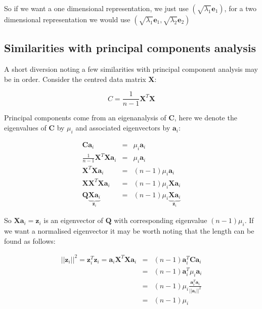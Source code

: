 So if we want a one dimensional representation, we just use  $\left( \sqrt{\lambda_{1}} \boldsymbol{e}_{1} \right) $, for a two dimensional representation we would use  $\left( \sqrt{\lambda_{1}} \boldsymbol{e}_{1},   \sqrt{\lambda_{2}} \boldsymbol{e}_{2} \right)$


\subsection{Similarities with principal components analysis}

A short diversion noting a few similarities with principal component analysis may be in order.   Consider the centred data matrix $\boldsymbol{X}$:

\begin{displaymath}
C = \frac{1}{n-1} \boldsymbol{X}^{T} \boldsymbol{X}
\end{displaymath}

Principal components come from an eigenanalysis of $\boldsymbol{C}$, here we denote the eigenvalues of $\boldsymbol{C}$ by $\mu_{i}$ and associated eigenvectors by $\boldsymbol{a}_{i}$:

\begin{eqnarray*}
\boldsymbol{C} \boldsymbol{a}_{i} &=& \mu_{i} \boldsymbol{a}_{i}\\
\frac{1}{n-1}\boldsymbol{X}^{T} \boldsymbol{X} \boldsymbol{a}_{i} &=& \mu_{i} \boldsymbol{a}_{i}\\
\boldsymbol{X}^{T} \boldsymbol{X} \boldsymbol{a}_{i} &=& (n-1)\mu_{i} \boldsymbol{a}_{i}\\
\boldsymbol{X}\boldsymbol{X}^{T} \boldsymbol{X} \boldsymbol{a}_{i} &=& (n-1)\mu_{i} \boldsymbol{X} \boldsymbol{a}_{i}\\
\boldsymbol{Q} \underbrace{\boldsymbol{X} \boldsymbol{a}_{i}}_{\boldsymbol{z}_{i}} &=& (n-1)\mu_{i} \underbrace{\boldsymbol{X} \boldsymbol{a}_{i}}_{\boldsymbol{z}_{i}}
\end{eqnarray*}

So $\boldsymbol{X} \boldsymbol{a}_{i} = \boldsymbol{z}_{i}$ is an eigenvector of $\boldsymbol{Q}$ with corresponding eigenvalue $(n-1) \mu_{i}$.   If we want a normalised eigenvector it may be worth noting that the length can be found as follows:

\begin{eqnarray*}
||\boldsymbol{z}_{i}||^{2} = \boldsymbol{z}_{i}^{T}\boldsymbol{z}_{i} = \boldsymbol{a}_{i} \boldsymbol{X}^{T} \boldsymbol{X} \boldsymbol{a}_{i} &=& (n-1) \boldsymbol{a}_{i}^{T} \boldsymbol{C} \boldsymbol{a}_{i}\\
 &=& (n-1) \boldsymbol{a}_{i}^{T} \mu_{i} \boldsymbol{a}_{i}\\
 &=& (n-1) \mu_{i} \frac{\boldsymbol{a}_{i}^{T} \boldsymbol{a}_{i}}{||\boldsymbol{a}_{i}||^{2}}\\
 &=& (n-1) \mu_{i}
\end{eqnarray*}

